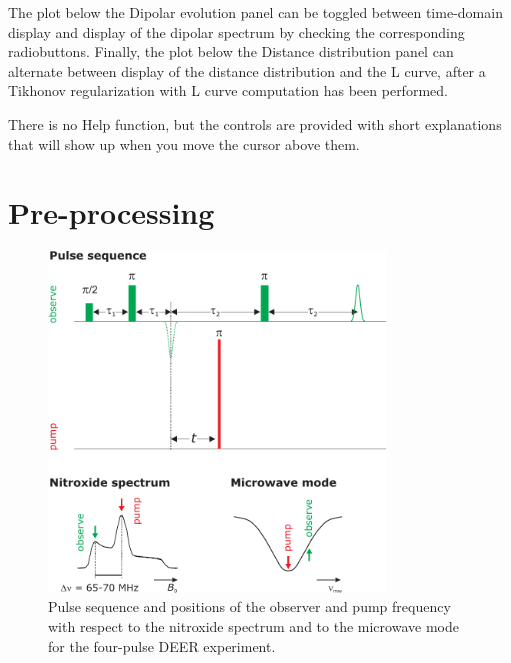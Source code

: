 \documentclass{article}
\begin{document}
The plot below the {\ttfamily Dipolar evolution} panel can be toggled between time-domain display and display of the dipolar spectrum by checking the corresponding radiobuttons. Finally, the plot below the {\ttfamily Distance distribution} panel can alternate between display of the distance distribution and the L curve, after a Tikhonov regularization with L curve computation has been performed.

There is no Help function, but the controls are provided with short explanations that will show up when you move the cursor above them. 

\section{Pre-processing}
\label{preprocess}

\begin{figure}[ht]
 	\begin{center}
  \includegraphics[width=0.8\textwidth]{fig2.pdf}
	\end{center}
	\caption{Pulse sequence and positions of the observer and pump frequency with
respect to the nitroxide spectrum and to the microwave mode for the four-pulse
DEER experiment.}
	\label{fig:manfig2}
\end{figure}
\end{document}
